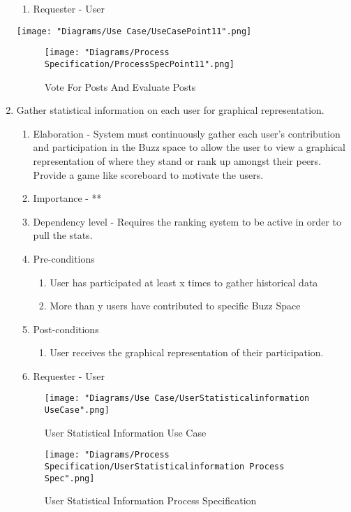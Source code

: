 \documentclass[12pt]{article}
\begin{document}
\begin{enumerate}
\begin{enumerate}
    \item Requester - User
  \end{enumerate}
  	\texttt{[image: "Diagrams/Use Case/UseCasePoint11".png]}
	  \begin{figure}[h]
  		\centering
  		\texttt{[image: "Diagrams/Process Specification/ProcessSpecPoint11".png]}
  		\caption{Vote For Posts And Evaluate Posts}
  	\end{figure}
\clearpage %
   \item Gather statistical information on each user for graphical representation. %
  \begin{enumerate}
    \item Elaboration - System must continuously gather each user’s contribution and participation in the Buzz space to allow the user to view a graphical representation of where they stand or rank up amongst their peers. Provide a game like scoreboard to motivate the users.
    \item Importance - **
    \item Dependency level - Requires the ranking system to be active in order to pull the stats. 
    \item Pre-conditions
    \begin{enumerate}
    	\item User has participated at least x times to gather historical data
    	\item More than y users have contributed to specific Buzz Space
    \end{enumerate}
        \item Post-conditions
    \begin{enumerate}
    	\item User receives the graphical representation of their participation.
    \end{enumerate}
    \item Requester - User
  \end{enumerate}
  \begin{figure}[h]
  	\centering
  	\texttt{[image: "Diagrams/Use Case/UserStatisticalinformation UseCase".png]}
  	\caption{User Statistical Information Use Case}
  \end{figure}
  \begin{figure}[h]
  	\centering
  	\texttt{[image: "Diagrams/Process Specification/UserStatisticalinformation Process Spec".png]}
  	\caption{User Statistical Information Process Specification}
  \end{figure}

\end{enumerate}
\end{document}
